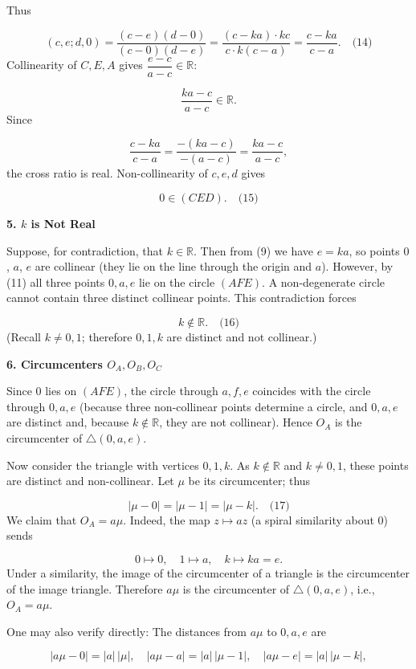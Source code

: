 \documentclass{llmxive}
\providecommand{\solutionheading}[1]{\par\smallskip\noindent\textbf{#1}\par}
\begin{document}
Thus\par
\[
(c,e;d,0) = \frac{(c - e)(d - 0)}{(c - 0)(d - e)} = \frac{(c - k a) \cdot k c}{c \cdot k(c - a)} = \frac{c - k a}{c - a}. \quad\text{(14)}
\]
Collinearity of \(C,E,A\) gives \(\dfrac{e - c}{a - c} \in \mathbb{R}\):\par
\[
\frac{k a - c}{a - c} \in \mathbb{R}.
\]
Since\par
\[
\frac{c - k a}{c - a} = \frac{-(k a - c)}{-(a - c)} = \frac{k a - c}{a - c},
\]
the cross ratio is real. Non-collinearity of \(c,e,d\) gives\par
\[
0 \in (CED). \quad\text{(15)}
\]
\smallskip
\solutionheading{5. \(k\) is Not Real}
Suppose, for contradiction, that \(k \in \mathbb{R}\). Then from (9) we have \(e = k a\), so points \(0\), \(a\), \(e\) are collinear (they lie on the line through the origin and \(a\)). However, by (11) all three points \(0,a,e\) lie on the circle \((AFE)\). A non-degenerate circle cannot contain three distinct collinear points. This contradiction forces\par
\[
k \notin \mathbb{R}. \quad\text{(16)}
\]
(Recall \(k \neq 0,1\); therefore \(0,1,k\) are distinct and not collinear.)\par
\smallskip
\solutionheading{6. Circumcenters \(O_A,O_B,O_C\)}
Since \(0\) lies on \((AFE)\), the circle through \(a,f,e\) coincides with the circle through \(0,a,e\) (because three non-collinear points determine a circle, and \(0,a,e\) are distinct and, because \(k \notin \mathbb{R}\), they are not collinear). Hence \(O_A\) is the circumcenter of \(\triangle (0,a,e)\).\par
Now consider the triangle with vertices \(0,1,k\). As \(k \notin \mathbb{R}\) and \(k \neq 0,1\), these points are distinct and non-collinear. Let \(\mu\) be its circumcenter; thus\par
\[
|\mu - 0| = |\mu - 1| = |\mu - k|. \quad\text{(17)}
\]
We claim that \(O_A = a \mu\). Indeed, the map \(z \mapsto a z\) (a spiral similarity about \(0\)) sends\par
\[
0 \mapsto 0,\quad 1 \mapsto a,\quad k \mapsto k a = e.
\]
Under a similarity, the image of the circumcenter of a triangle is the circumcenter of the image triangle. Therefore \(a \mu\) is the circumcenter of \(\triangle (0,a,e)\), i.e., \(O_A = a \mu\).\par
One may also verify directly: The distances from \(a\mu\) to \(0,a,e\) are\par
\[
|a\mu - 0| = |a|\,|\mu|,\quad |a\mu - a| = |a|\,|\mu - 1|,\quad |a\mu - e| = |a|\,|\mu - k|,
\]
\end{document}

